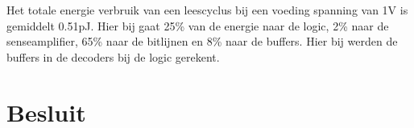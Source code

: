 Het totale energie verbruik van een leescyclus bij een voeding spanning van 1V is gemiddelt 0.51pJ. Hier bij gaat 25\% van de energie naar de logic, 2\% naar de senseamplifier, 65\% naar de bitlijnen en 8\% naar de buffers. Hier bij werden de buffers in de decoders bij de logic gerekent.

\section{Besluit}

